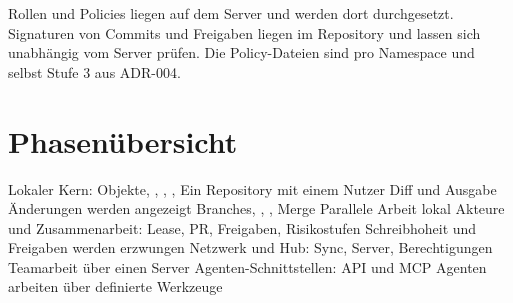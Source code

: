 Rollen und Policies liegen auf dem Server und werden dort durchgesetzt. Signaturen von Commits und Freigaben liegen im Repository und lassen sich unabhängig vom Server prüfen. Die Policy-Dateien sind pro Namespace und selbst Stufe 3 aus ADR-004.

\section{Phasenübersicht}

\starttable[|lw(2.2cm)|lw(6.3cm)|lw(6.3cm)|]
\HL
{}   \NC \NR
\HL
{} \NC Lokaler Kern: Objekte, , , ,  \NC Ein Repository mit einem Nutzer \NC \NR
{} \NC Diff und Ausgabe \NC Änderungen werden angezeigt \NC \NR
{} \NC Branches, , , Merge \NC Parallele Arbeit lokal \NC \NR
{} \NC Akteure und Zusammenarbeit: Lease, PR, Freigaben, Risikostufen \NC Schreibhoheit und Freigaben werden erzwungen \NC \NR
{} \NC Netzwerk und Hub: Sync, Server, Berechtigungen \NC Teamarbeit über einen Server \NC \NR
{} \NC Agenten-Schnittstellen: API und MCP \NC Agenten arbeiten über definierte Werkzeuge \NC \NR
\HL
\stoptable
